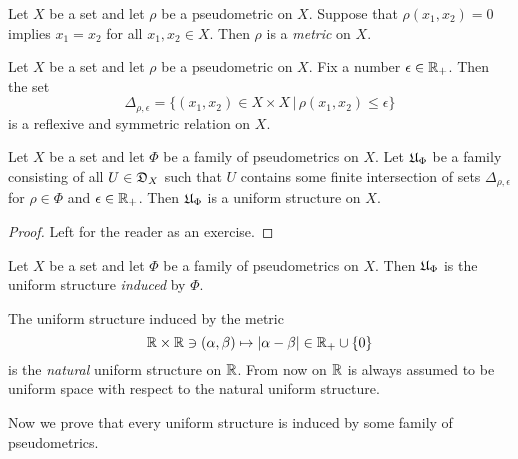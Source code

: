 \begin{definition}
	Let $X$ be a set and let $\rho$ be a pseudometric on $X$. Suppose that $\rho(x_1,x_2) = 0$ implies $x_1 = x_2$ for all $x_1,x_2 \in X$. Then $\rho$ is a \textit{metric} on $X$.
\end{definition}
\noindent
Let $X$ be a set and let $\rho$ be a pseudometric on $X$. Fix a number $\epsilon \in {\mathbb R}_+$. Then the set
$$\Delta_{\rho, \epsilon} = \big\{(x_1,x_2) \in X\times X\,\big|\,\rho(x_1, x_2) \leq \epsilon \big\}$$
is a reflexive and symmetric relation on $X$.

\begin{fact}\label{fact:uniform_structures_induced_by_families_of_pseudometrics}
	Let $X$ be a set and let $\Phi$ be a family of pseudometrics on $X$. Let ${\mathfrak U}_{\Phi}$ be a family consisting of all $U\in {\mathfrak D}_X$ such that $U$ contains some finite intersection of sets $\Delta_{\rho, \epsilon}$ for $\rho \in \Phi$ and $\epsilon \in {\mathbb R}_+$. Then ${\mathfrak U}_{\Phi}$ is a uniform structure on $X$.
\end{fact}
\begin{proof}
	Left for the reader as an exercise.
\end{proof}

\begin{definition}
	Let $X$ be a set and let $\Phi$ be a family of pseudometrics on $X$. Then ${\mathfrak U}_{\Phi}$ is the uniform structure \textit{induced} by $\Phi$.
\end{definition}

\begin{example}\label{example:natural_uniform_structure_on_reals}
	The uniform structure induced by the metric
	$${\mathbb R}\times {\mathbb R} \ni (\alpha, \beta) \mapsto |\alpha - \beta| \in {\mathbb R}_+\cup \{0\}$$
	is the \textit{natural} uniform structure on ${\mathbb R}$. From now on ${\mathbb R}$ is always assumed to be uniform space with respect to the natural uniform structure.
\end{example}
\noindent
Now we prove that every uniform structure is induced by some family of pseudometrics.

